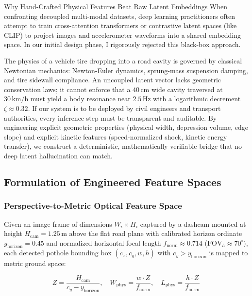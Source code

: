 \begin{designreflection}{Why Hand-Crafted Physical Features Beat Raw Latent Embeddings}
When confronting decoupled multi-modal datasets, deep learning practitioners often attempt to train cross-attention transformers or contrastive latent spaces (like CLIP) to project images and accelerometer waveforms into a shared embedding space. In our initial design phase, I rigorously rejected this black-box approach. 

The physics of a vehicle tire dropping into a road cavity is governed by classical Newtonian mechanics: Newton-Euler dynamics, sprung-mass suspension damping, and tire sidewall compliance. An uncoupled latent vector lacks geometric conservation laws; it cannot enforce that a $40\,\text{cm}$ wide cavity traversed at $30\,\text{km/h}$ must yield a body resonance near $2.5\,\text{Hz}$ with a logarithmic decrement $\zeta \approx 0.32$. If our system is to be deployed by civil engineers and transport authorities, every inference step must be transparent and auditable. By engineering explicit geometric properties (physical width, depression volume, edge slope) and explicit kinetic features (speed-normalized shock, kinetic energy transfer), we construct a deterministic, mathematically verifiable bridge that no deep latent hallucination can match.
\end{designreflection}

\subsection{Formulation of Engineered Feature Spaces}

\subsubsection{Perspective-to-Metric Optical Feature Space}
Given an image frame of dimensions $W_i \times H_i$ captured by a dashcam mounted at height $H_{\text{cam}} = 1.25\,\text{m}$ above the flat road plane with calibrated horizon ordinate $y_{\text{horizon}} = 0.45$ and normalized horizontal focal length $f_{\text{norm}} \approx 0.714$ ($\text{FOV}_h \approx 70^\circ$), each detected pothole bounding box $(c_x, c_y, w, h)$ with $c_y > y_{\text{horizon}}$ is mapped to metric ground space:

\begin{equation}
    Z = \frac{H_{\text{cam}}}{c_y - y_{\text{horizon}}}, \quad W_{\text{phys}} = \frac{w \cdot Z}{f_{\text{norm}}}, \quad L_{\text{phys}} = \frac{h \cdot Z}{f_{\text{norm}}}
    \label{eq:metric_unprojection_fe}
\end{equation}

